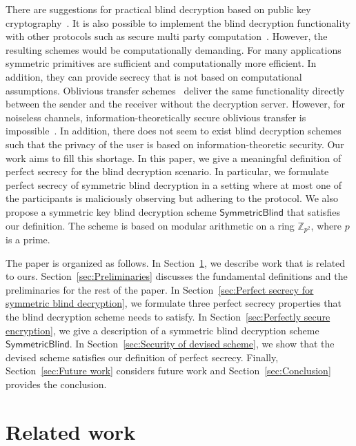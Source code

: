 \documentclass[10pt,journal]{IEEEtran}
\newcommand{\Z}{\mathbb{Z}}
\newcommand{\sch}[1]{\mathsf{#1}}
\begin{document}
There are suggestions for practical blind decryption based on public key cryptography~\cite{Sakurai_1996,Sakurai_1998,Sameshima_1998,Ogata_2009,Green_2011}.
It is also possible to implement the blind decryption functionality with other protocols
such as secure multi party computation~\cite{Yao_1986}.
However, the resulting schemes would
be computationally demanding.
For many applications symmetric primitives are sufficient and
computationally more efficient.
In addition, they can provide secrecy that is not based on computational assumptions.
Oblivious transfer schemes~\cite{Rabin_1981,Even_1985} deliver the same functionality
directly between the sender and the receiver without the decryption server.
However, for noiseless channels, information-theoretically secure oblivious transfer is impossible~\cite{Damgard_1999}.
In addition, there does not seem to exist
blind decryption schemes such that the privacy of the user is based on information-theoretic security.
Our work aims to fill this shortage.
In this paper, we give a meaningful definition of perfect secrecy
for the blind decryption scenario.
In particular, we formulate
perfect secrecy of symmetric blind decryption
in a setting where at most one of the participants is maliciously observing
but adhering to the protocol.
We also propose
a
symmetric key blind decryption scheme $\sch{SymmetricBlind}$ that satisfies
our definition.
The scheme is based on modular arithmetic on a ring $\Z_{p^2}$, where $p$
is a prime.

The paper is organized as follows.
In Section~\ref{sec:Related work}, we describe work that is related to ours.
 Section~\ref{sec:Preliminaries} discusses the
fundamental definitions and the preliminaries for the rest of the paper.
In Section~\ref{sec:Perfect secrecy for symmetric blind decryption}, we formulate
three perfect secrecy properties that
the blind decryption scheme needs to satisfy.
In Section~\ref{sec:Perfectly secure encryption},
we give a description of a symmetric blind decryption scheme $\sch{SymmetricBlind}$.
In Section~\ref{sec:Security of devised scheme}, we
show that the devised scheme
satisfies our definition of perfect secrecy.
Finally, Section~\ref{sec:Future work}
considers future work and Section~\ref{sec:Conclusion}
provides the conclusion.

\section{Related work}
\label{sec:Related work}
\end{document}
